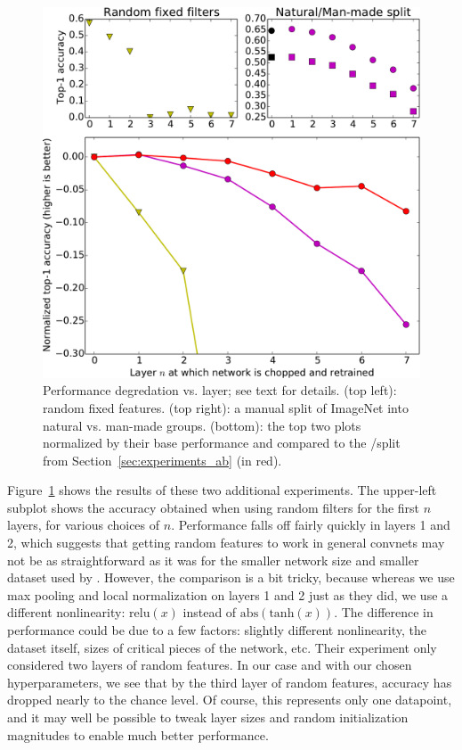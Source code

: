 \begin{figure}[t]
\begin{center}
\includegraphics[width=.7\linewidth]{plots/result_random_nm_combined_crop.pdf}
\end{center}
\caption{Performance degredation vs. layer; see text for details. (top left): random fixed features. (top right): a manual split of ImageNet into natural vs. man-made groups. (bottom): the top two plots normalized by their base performance and compared to the \dA/\dB split from Section~\ref{sec:experiments_ab} (in red).}
\label{fig:random_and_nm}
\end{figure}

Figure~\ref{fig:random_and_nm} shows the results of these two additional experiments. The upper-left subplot shows the accuracy obtained when using random filters for the first $n$ layers, for various choices of $n$. Performance falls off fairly quickly in layers 1 and 2, which suggests that getting random features to work in general convnets may not be as straightforward as it was for the smaller network size and smaller dataset used by \cite{Jarrett-ICCV2009}. However, the comparison is a bit tricky, because whereas we use max pooling and local normalization on layers 1 and 2 just as they did, we use a different nonlinearity: $\mathrm{relu}(x)$ instead of $\mathrm{abs}(\mathrm{tanh}(x))$. The difference in performance could be due to a few factors: slightly different nonlinearity, the dataset itself, sizes of critical pieces of the network, etc. Their experiment only considered two layers of random features. In our case and with our chosen hyperparameters, we see that by the third layer of random features, accuracy has dropped nearly to the chance level. Of course, this represents only one datapoint, and it may well be possible to tweak layer sizes and random initialization magnitudes to enable much better performance.

